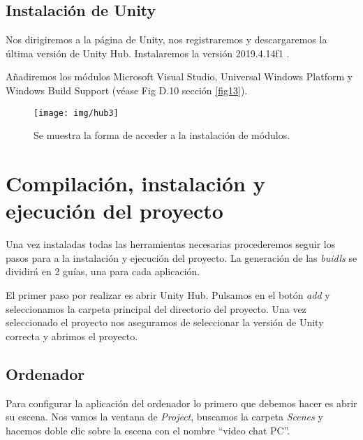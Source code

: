 \subsection{Instalación de Unity}

Nos dirigiremos a la página de Unity, nos registraremos y descargaremos la última versión de Unity Hub.
Instalaremos la versión 2019.4.14f1 \cite{unity:version}. 


Añadiremos los módulos Microsoft Visual Studio, Universal Windows Platform y Windows Build Support (véase Fig D.10 sección \ref{fig13}).

\begin{figure}
\centering
\texttt{[image: img/hub3]}
\caption{Se muestra la forma de acceder a la instalación de módulos.}
\end{figure}\label{fig13}


\section{Compilación, instalación y ejecución del proyecto} \label{pepe}

Una vez instaladas todas las herramientas necesarias procederemos seguir los pasos para a la instalación y ejecución del proyecto. La generación de las \textit{buidls} se dividirá en 2 guías, una para cada aplicación.

El primer paso por realizar es abrir Unity Hub. Pulsamos en el botón \textit{add} y seleccionamos la carpeta principal del directorio del proyecto. Una vez seleccionado el proyecto nos aseguramos de seleccionar la versión de Unity correcta y abrimos el proyecto.



\subsection{Ordenador}

Para configurar la aplicación del ordenador lo primero que debemos hacer es abrir su escena. Nos vamos la ventana de \textit{Project}, buscamos la carpeta \textit{Scenes} y hacemos doble clic sobre la escena con el nombre “video chat PC”.


